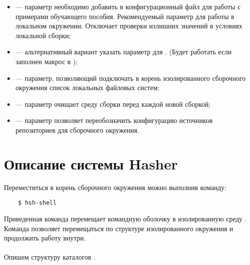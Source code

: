 \begin{itemize}
	\item {} ---  параметр необходимо  добавить в конфигурационный
	файл для работы с примерами обучающего пособия. Рекомендуемый параметр для работы в локальном
	окружении. Отключает проверки излишних значений в условиях локальной сборки;
	\item {} --- альтернативный вариант указать параметр  для .
	(Будет работать если заполнен макрос   в );
	\item {} --- параметр, позволяющий подключать в корень изолированного сборочного
	окружения список локальных файловых систем;
	\item {} --- параметр очищает среду сборки перед каждой новой сборкой;
	\item {} --- параметр позволяет переобозначить конфигурацию источников
	репозиториев для сборочного окружения.
\end{itemize}

\section{Описание системы Hasher}
Переместиться в корень сборочного окружения можно выполнив команду:
\begin{verbatim}
	$ hsh-shell
\end{verbatim}
Приведенная команда перемещает командную оболочку в изолированную среду .
Команда позволяет перемещаться по структуре изолированного окружения и продолжить работу
внутри.\\
\\
Опишем структуру каталогов .

